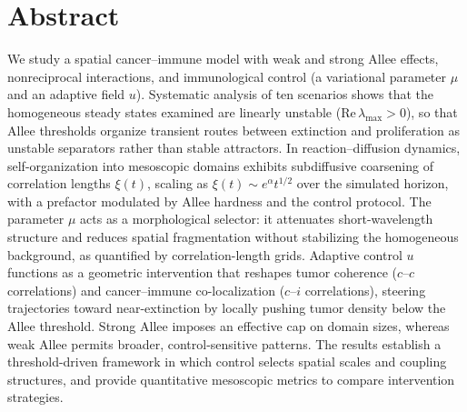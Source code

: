 \documentclass[12pt,oneside]{report}
\begin{document}
\chapter*{Abstract}

We study a spatial cancer--immune model with weak and strong Allee effects, nonreciprocal interactions, and immunological control (a variational parameter $\mu$ and an adaptive field $u$). Systematic analysis of ten scenarios shows that the homogeneous steady states examined are linearly unstable ($\mathrm{Re}\,\lambda_{\max}>0$), so that Allee thresholds organize transient routes between extinction and proliferation as unstable separators rather than stable attractors. In reaction--diffusion dynamics, self-organization into mesoscopic domains exhibits subdiffusive coarsening of correlation lengths $\xi(t)$, scaling as $\xi(t)\sim e^{\alpha}t^{1/2}$ over the simulated horizon, with a prefactor modulated by Allee hardness and the control protocol. The parameter $\mu$ acts as a morphological selector: it attenuates short-wavelength structure and reduces spatial fragmentation without stabilizing the homogeneous background, as quantified by correlation-length grids. Adaptive control $u$ functions as a geometric intervention that reshapes tumor coherence ($c$--$c$ correlations) and cancer--immune co-localization ($c$--$i$ correlations), steering trajectories toward near-extinction by locally pushing tumor density below the Allee threshold. Strong Allee imposes an effective cap on domain sizes, whereas weak Allee permits broader, control-sensitive patterns. The results establish a threshold-driven framework in which control selects spatial scales and coupling structures, and provide quantitative mesoscopic metrics to compare intervention strategies.

\tableofcontents
\listoffigures
{}
\listoftables
{}

\clearpage
{}













\appendix


\end{document}
